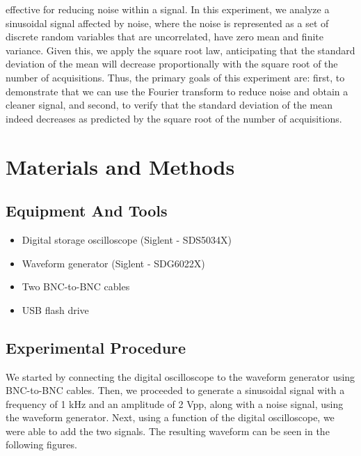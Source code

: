 \documentclass[a4paper,12pt]{article}
\begin{document}
effective for reducing noise within a signal. In this experiment, we analyze a
sinusoidal signal affected by noise, where the noise is represented as a set of 
discrete random variables that are uncorrelated, have zero mean and 
finite variance. Given this, we apply the square root law, anticipating that 
the standard deviation of the mean will decrease proportionally with the square 
root of the number of acquisitions.
Thus, the primary goals of this experiment are: first, to demonstrate 
that we can use the Fourier transform to reduce noise and obtain a cleaner 
signal, and second, to verify that the standard deviation of the mean indeed 
decreases as predicted by the square root of the number of acquisitions.



\section{Materials and Methods}
\subsection{Equipment And Tools}
\begin{itemize}
    \item Digital storage oscilloscope (Siglent - SDS5034X)
    \item Waveform generator (Siglent - SDG6022X)
    \item Two BNC-to-BNC cables
    \item USB flash drive
\end{itemize}

\subsection{Experimental Procedure}
We started by connecting the digital oscilloscope to the waveform generator 
using BNC-to-BNC cables. Then, we proceeded to generate a sinusoidal signal 
with a frequency of 1 kHz and an amplitude of 2 Vpp, along with a noise signal, 
using the waveform generator.
Next, using a function of the digital oscilloscope, we were able to add the two signals.
The resulting waveform can be seen in the following figures. 
\end{document}
